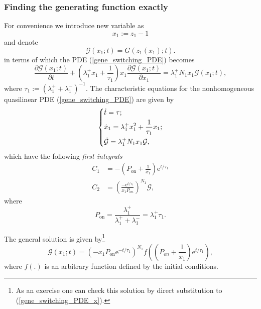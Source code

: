 \documentclass[a4paper, 11pt]{article}
\begin{document}
\subsubsection{Finding the generating function exactly}
For convenience we introduce new variable as
\begin{equation*}
  x_1 := z_1 - 1
\end{equation*}
and denote
\begin{equation*}
  \mathcal G(x_1; t) = G(z_1(x_1); t).
\end{equation*}
in terms of which the PDE (\ref{gene_switching_PDE}) becomes
\begin{equation} \label{gene_switching_PDE_x}
  \frac{\partial \mathcal G(x_1;t)}{\partial t} + (\lambda_1^+x_1 + \frac{1}{\tau_1})x_1\frac{\partial \mathcal G(x_1;t)}{\partial x_1} = \lambda_1^+N_1x_1\mathcal G(x_1;t),
\end{equation}
where $\tau_1 := (\lambda_1^+ + \lambda_1^-)^{-1}$.
The characteristic equations for the nonhomogeneous quasilinear PDE (\ref{gene_switching_PDE}) are given by
\begin{equation*}
  \begin{dcases}
    \dot t = \tau;\\
    \dot x_1 = \lambda_1^+x_1^2 + \frac{1}{\tau_1}x_1;\\
    \dot{\mathcal G} = \lambda_1^+N_1x_1\mathcal G,
  \end{dcases}
\end{equation*}
which have the following {\it first integrals}
\begin{align*}
  C_1& = -\left(P_\text{on}+\frac{1}{x_1}\right)\mathrm e^{t/\tau_1}\\
  C_2& = \left(\frac{-\mathrm e^{t/\tau_1}}{x_1P_{on}}\right)^{N_1}\mathcal G,
\end{align*}
where
\begin{equation*}
  P_\text{on} = \frac{\lambda_1^+}{\lambda_1^+ + \lambda_1^-} = \lambda_1^+\tau_1.
\end{equation*}

The general solution is given by\footnote{As an exercise one can check this solution by direct substitution to (\ref{gene_switching_PDE_x}).}
\begin{equation}\label{n1_general_solution}
  \mathcal G(x_1;t) = \left(-x_1P_{\text{on}}\mathrm e^{-t/\tau_1}\right)^{N_1}f\left(\left(P_{on}+\frac{1}{x_1}\right)\mathrm e^{t/\tau_1}\right),
\end{equation}
where $f(.)$ is an arbitrary function defined by the initial conditions.
\end{document}
